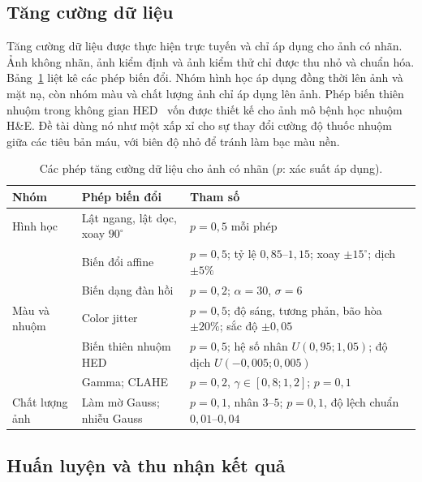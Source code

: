 \subsection{Tăng cường dữ liệu}

Tăng cường dữ liệu được thực hiện trực tuyến và chỉ áp dụng cho ảnh có nhãn. Ảnh không nhãn, ảnh kiểm định và ảnh kiểm thử chỉ được thu nhỏ và chuẩn hóa. Bảng~\ref{tab:aug} liệt kê các phép biến đổi. Nhóm hình học áp dụng đồng thời lên ảnh và mặt nạ, còn nhóm màu và chất lượng ảnh chỉ áp dụng lên ảnh. Phép biến thiên nhuộm trong không gian HED~\cite{tellez2018hed} vốn được thiết kế cho ảnh mô bệnh học nhuộm H\&E. Đề tài dùng nó như một xấp xỉ cho sự thay đổi cường độ thuốc nhuộm giữa các tiêu bản máu, với biên độ nhỏ để tránh làm bạc màu nền.

\begin{table}[ht]
\centering
\caption{Các phép tăng cường dữ liệu cho ảnh có nhãn ($p$: xác suất áp dụng).}
\label{tab:aug}
\small
\begin{tabularx}{\textwidth}{>{\raggedright\arraybackslash}p{2.6cm} >{\raggedright\arraybackslash}p{4.4cm} >{\raggedright\arraybackslash}X}
\toprule
Nhóm & Phép biến đổi & Tham số \\
\midrule
Hình học & Lật ngang, lật dọc, xoay $90^\circ$ & $p=0{,}5$ mỗi phép \\
         & Biến đổi affine & $p=0{,}5$; tỷ lệ $0{,}85$--$1{,}15$; xoay $\pm15^\circ$; dịch $\pm5\%$ \\
         & Biến dạng đàn hồi & $p=0{,}2$; $\alpha=30$, $\sigma=6$ \\
Màu và nhuộm & Color jitter & $p=0{,}5$; độ sáng, tương phản, bão hòa $\pm20\%$; sắc độ $\pm0{,}05$ \\
             & Biến thiên nhuộm HED & $p=0{,}5$; hệ số nhân $U(0{,}95;1{,}05)$; độ dịch $U(-0{,}005;0{,}005)$ \\
             & Gamma; CLAHE & $p=0{,}2$, $\gamma\in[0{,}8;1{,}2]$; $p=0{,}1$ \\
Chất lượng ảnh & Làm mờ Gauss; nhiễu Gauss & $p=0{,}1$, nhân $3$--$5$; $p=0{,}1$, độ lệch chuẩn $0{,}01$--$0{,}04$ \\
\bottomrule
\end{tabularx}
\end{table}

\subsection{Huấn luyện và thu nhận kết quả}

